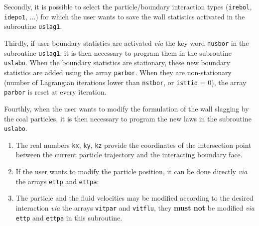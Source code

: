 {{{\noindent
Secondly, it is possible to select the particle/boundary interaction types
(\texttt{irebol}, \texttt{idepo1}, ...) for which the user wants to save the wall
statistics activated in the subroutine \texttt{uslag1}.

\noindent
Thirdly, if user boundary statistics are activated {\em via}
the key word \texttt{nusbor} in the subroutine \texttt{uslag1}, it
is then necessary to program them in the subroutine
\texttt{uslabo}. When the boundary statistics are stationary, these new
boundary statistics are added using the array \texttt{parbor}. When they are
non-stationary (number of Lagrangian iterations lower than \texttt{nstbor}, or
\texttt{isttio} = 0), the array \texttt{parbor} is reset at every iteration.

\noindent
Fourthly, when the user wants to modify the formulation of the wall
slagging by the coal particles, it is then necessary to program the new laws
in the subroutine \texttt{uslabo}.

\noindent
{}
\begin{enumerate}
\item The real numbers \texttt{kx}, \texttt{ky}, \texttt{kz} provide the
      coordinates of the intersection
      point between the current particle trajectory and the interacting
      boundary face.

\item If the user wants to modify the particle position, it can be done
      directly {\em via} the arrays \texttt{ettp} and \texttt{ettpa}:


\item The particle and the fluid velocities may be modified according to
      the desired interaction {\em via} the arrays \texttt{vitpar}
      and \texttt{vitflu}, they \textbf{must not} be modified {\em
      via} \texttt{ettp} and \texttt{ettpa} in this subroutine.


\end{enumerate}}}}
